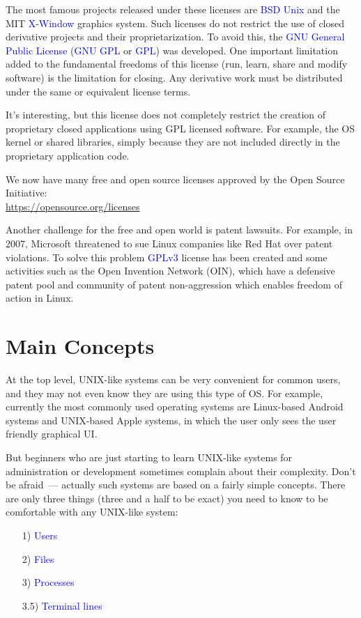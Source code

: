 \documentclass[12pt]{report}
\newcommand{\struct}[1]{\textcolor{blue}{#1}}
\begin{document}
\medskip
The most famous projects released under these licenses are \struct{BSD Unix} and
the MIT \struct{X-Window} graphics system. Such licenses do not restrict
the use of closed derivative projects and their proprietarization.
To avoid this, the \struct{GNU General Public License} (\struct{GNU GPL} or
\struct{GPL}) was developed. One important limitation added to the fundamental
freedoms of this license (run, learn, share and modify software) is
the limitation for closing. Any derivative work must be distributed under
the same or equivalent license terms.

\medskip
It's interesting, but this license does not completely restrict the creation of
proprietary closed applications using GPL licensed software. For example,
the OS kernel or shared libraries, simply because they are not included
directly in the proprietary application code.

\medskip
We now have many free and open source licenses approved by
the Open Source Initiative:\\
\href{https://opensource.org/licenses}{\url{https://opensource.org/licenses}}

\medskip
Another challenge for the free and open world is patent lawsuits.
For example, in 2007, Microsoft threatened to sue Linux companies like Red Hat
over patent violations. To solve this problem \struct{GPLv3} license has been
created and some activities such as the Open Invention Network (OIN),
which have a defensive patent pool and community of patent non-aggression
which enables freedom of action in Linux.

\section*{Main Concepts}

At the top level, UNIX-like systems can be very convenient for common
users, and they may not even know they are using this type of OS.
For example, currently the most commonly used operating systems are
Linux-based Android systems and UNIX-based Apple systems, in which
the user only sees the user friendly graphical UI.

\medskip
But beginners who are just starting to learn UNIX-like systems
for administration or development sometimes complain about their complexity.
Don't be afraid~--- actually such systems are based on a fairly simple concepts.
There are only three things (three and a half to be exact) you need to know
to be comfortable with any UNIX-like system:
\begin{itemize}
\item[1)] \struct{Users}
\item[2)] \struct{Files}
\item[3)] \struct{Processes}
\item[3.5)] \struct{Terminal lines}
\end{itemize}
\end{document}
